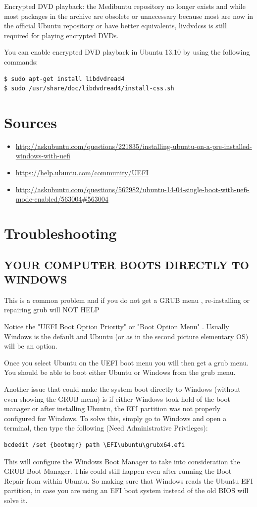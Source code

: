 \documentclass{../guide}
\begin{document}
Encrypted DVD playback: the Medibuntu repository no longer exists and while most packages in the archive are obsolete or unnecessary because most are now in the official Ubuntu repository or have better equivalents, livdvdcss is still required for playing encrypted DVDs.

You can enable encrypted DVD playback in Ubuntu 13.10 by using the following commands:
\begin{verbatim}
$ sudo apt-get install libdvdread4
$ sudo /usr/share/doc/libdvdread4/install-css.sh
\end{verbatim}


\section*{Sources}
\begin{itemize}
  \item \url{http://askubuntu.com/questions/221835/installing-ubuntu-on-a-pre-installed-windows-with-uefi}
  \item \url{https://help.ubuntu.com/community/UEFI}
  \item \url{http://askubuntu.com/questions/562982/ubuntu-14-04-single-boot-with-uefi-mode-enabled/563004#563004}
\end{itemize}

\section{Troubleshooting}

\subsection{YOUR COMPUTER BOOTS DIRECTLY TO WINDOWS}

This is a common problem and if you do not get a GRUB menu , re-installing or repairing grub will NOT HELP

Notice the "UEFI Boot Option Priority" or "Boot Option Menu" . Usually Windows is the default and Ubuntu (or as in the second picture elementary OS) will be an option.

Once you select Ubuntu on the UEFI boot menu you will then get a grub menu. You should be able to boot either Ubuntu or Windows from the grub menu.

Another issue that could make the system boot directly to Windows (without even showing the GRUB menu) is if either Windows took hold of the boot manager or after installing Ubuntu, the EFI partition was not properly configured for Windows. To solve this, simply go to Windows and open a terminal, then type the following (Need Administrative Privileges):
\begin{verbatim}
bcdedit /set {bootmgr} path \EFI\ubuntu\grubx64.efi
\end{verbatim}
This will configure the Windows Boot Manager to take into consideration the GRUB Boot Manager. This could still happen even after running the Boot Repair from within Ubuntu. So making sure that Windows reads the Ubuntu EFI partition, in case you are using an EFI boot system instead of the old BIOS will solve it.
\end{document}
